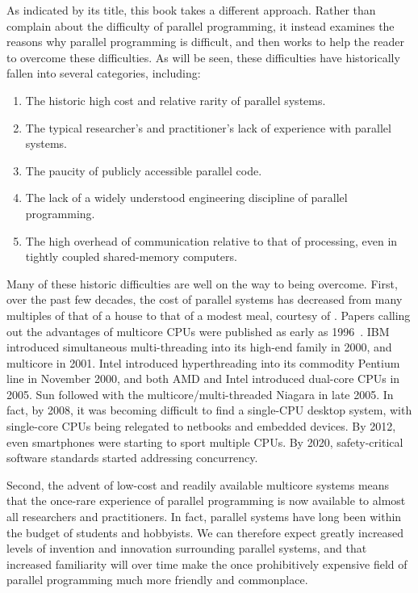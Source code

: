 As indicated by its title, this book takes a different approach.
Rather than complain about the difficulty of parallel programming,
it instead examines the reasons why parallel programming is
difficult, and then works to help the reader to overcome these
difficulties.
As will be seen, these difficulties have historically fallen into several
categories, including:

\begin{enumerate}
\item	The historic high cost and relative rarity of parallel systems.
\item	The typical researcher's and practitioner's lack of experience
	with parallel systems.
\item	The paucity of publicly accessible parallel code.
\item	The lack of a widely understood engineering discipline of
	parallel programming.
\item	The high overhead of communication relative to that of processing,
	even in tightly coupled shared-memory computers.
\end{enumerate}

Many of these historic difficulties are well on the way to being overcome.
First, over the past few decades, the cost of parallel systems
has decreased from many multiples of that of a house to that of a
modest meal, courtesy of .
Papers calling out the advantages of multicore CPUs were published
as early as 1996~\cite{Olukotun96}.
IBM introduced simultaneous multi-threading
into its high-end \Power{} family in 2000, and multicore in 2001.
Intel introduced hyperthreading into its commodity Pentium line in
November 2000, and both AMD and Intel introduced
dual-core CPUs in 2005.
Sun followed with the multicore/multi-threaded Niagara in late 2005.
In fact, by 2008, it was becoming difficult
to find a single-CPU desktop system, with single-core CPUs being
relegated to netbooks and embedded devices.
By 2012, even smartphones were starting to sport multiple CPUs.
By 2020, safety-critical software standards started addressing
concurrency.

Second, the advent of low-cost and readily available multicore systems
means that the once-rare experience of parallel programming is
now available to almost all researchers and practitioners.
In fact, parallel systems have long been within the budget of students
and hobbyists.
We can therefore expect greatly increased levels of invention and
innovation surrounding parallel systems, and that increased familiarity
will over time make the once prohibitively expensive field of parallel
programming much more friendly and commonplace.

